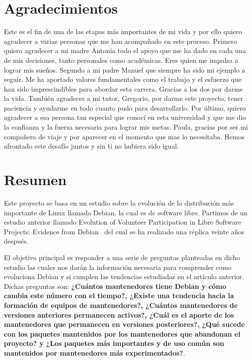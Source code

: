 \documentclass[a4paper, 12pt]{book}
\begin{document}
\chapter*{Agradecimientos}

Este es el fin de una de las etapas más importantes de mi vida y por ello quiero agradecer a varias personas que me han acompañado en este proceso.
Primero quiero agradecer a mi madre Antonia todo el apoyo que me ha dado en cada una de mis decisiones, tanto personales como académicas. Eres quien me impulsa a lograr mis sueños.
Segundo a mi padre Manuel que siempre ha sido mi ejemplo a seguir. Me ha aportado valores fundamentales como el trabajo y el esfuerzo que han sido imprescindibles para abordar esta carrera.
Gracias a los dos por darme la vida.
También agradecer a mi tutor, Gregorio, por darme este proyecto, tener paciencia  y ayudarme en todo cuanto pudo para desarrollarlo.
Por último, quiero agradecer a esa persona tan especial que conocí en esta universidad y que me dio la confianza y la fuerza necesaria para lograr mis metas. 
Paula, gracias por ser mi compañera de viaje y por aparecer en el momento que mas lo necesitaba. Hemos afrontado este desafío juntos y sin ti no hubiera sido igual.



\chapter*{Resumen}

Este proyecto se basa en un estudio sobre la evolución de la distribución más importante de Linux llamada Debian, la cual es de software libre. Partimos de un estudio anterior llamado Evolution of Volunteer Participation in Libre Software Projects: Evidence from Debian~\cite{robles05:_debian} del cual se ha realizado una réplica veinte años después. 

El objetivo principal es responder a una serie de preguntas planteadas en dicho estudio las cuales nos darán la información necesaria para comprender como evoluciona Debian y si cumplen las tendencias estudiadas en el artículo anterior.
Dichas preguntas son: \textbf {¿Cuántos mantenedores tiene Debian y cómo cambia este número con el tiempo?, ¿Existe una tendencia hacia la formación de equipos de mantenedores?, ¿Cuántos mantenedores de versiones anteriores permanecen activos?, ¿Cuál es el aporte de los mantenedores que permanecen en versiones posteriores?, ¿Qué sucede con los paquetes mantenidos por los mantenedores que abandonan el proyecto? y ¿Los paquetes más importantes y de uso común son mantenidos por mantenedores más experimentados?}.
\end{document}
